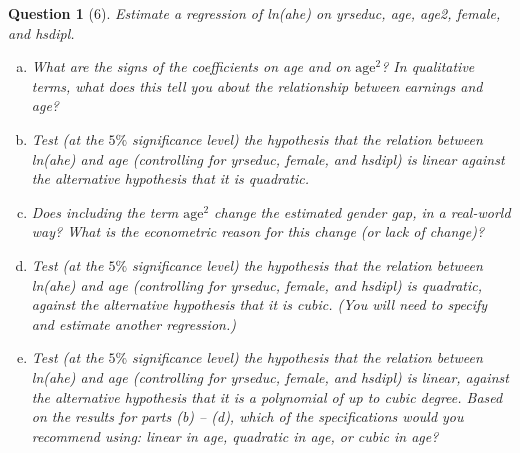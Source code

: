 \documentclass[12pt,reqno]{amsart}
\theoremstyle{plain}
\newtheorem*{theorem*}{Question}
\begin{document}
\begin{theorem*}[6]
    \normalfont
    Estimate a regression of ln(\textit{ahe}) on \textit{yrseduc}, \textit{age}, \textit{age2}, \textit{female}, and \textit{hsdipl}.
    \begin{enumerate}[(a)]
        \item What are the signs of the coefficients on age and on $ \text{age}^{2} $? In qualitative
              terms, what does this tell you about the relationship between earnings and age?
        \item Test (at the $ 5\% $ significance level) the hypothesis that the relation between
              ln(\textit{ahe}) and \textit{age} (controlling for \textit{yrseduc}, \textit{female}, and
              \textit{hsdipl}) is linear against the alternative hypothesis that it is quadratic.
        \item Does including the term $ \text{age}^{2} $ change the estimated gender gap, in a
              real-world way? What is the econometric reason for this change (or lack of change)?
        \item Test (at the $ 5\% $ significance level) the hypothesis that the relation between
              ln(\textit{ahe}) and \textit{age} (controlling for \textit{yrseduc}, \textit{female}, and
              \textit{hsdipl}) is quadratic, against the alternative hypothesis that it is cubic.
              (You will need to specify and estimate another regression.)
        \item Test (at the $ 5\% $ significance level) the hypothesis that the relation between
              ln(\textit{ahe}) and \textit{age} (controlling for \textit{yrseduc}, \textit{female}, and
              \textit{hsdipl}) is linear, against the alternative hypothesis that it is a polynomial
              of up to cubic degree. Based on the results for parts (b) – (d), which of the
              specifications would you recommend using: linear in age, quadratic in age, or cubic
              in age?
    \end{enumerate}
\end{theorem*}
\end{document}
